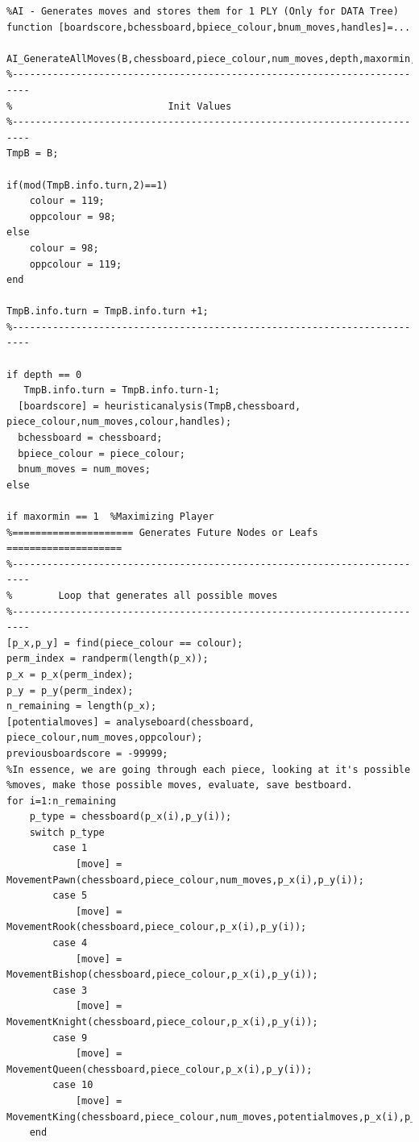 \documentclass[11pt,a4paper]{article}
\begin{document}
\begin{lstlisting}
%AI - Generates moves and stores them for 1 PLY (Only for DATA Tree)
function [boardscore,bchessboard,bpiece_colour,bnum_moves,handles]=...
    AI_GenerateAllMoves(B,chessboard,piece_colour,num_moves,depth,maxormin,alpha,beta,handles)
%-------------------------------------------------------------------------
%                           Init Values
%-------------------------------------------------------------------------
TmpB = B;

if(mod(TmpB.info.turn,2)==1)
    colour = 119;
    oppcolour = 98;
else
    colour = 98;
    oppcolour = 119;
end

TmpB.info.turn = TmpB.info.turn +1;
%-------------------------------------------------------------------------

if depth == 0
   TmpB.info.turn = TmpB.info.turn-1;
  [boardscore] = heuristicanalysis(TmpB,chessboard, piece_colour,num_moves,colour,handles);
  bchessboard = chessboard;
  bpiece_colour = piece_colour;
  bnum_moves = num_moves;
else

if maxormin == 1  %Maximizing Player
%===================== Generates Future Nodes or Leafs ====================
%-------------------------------------------------------------------------
%        Loop that generates all possible moves
%-------------------------------------------------------------------------
[p_x,p_y] = find(piece_colour == colour);
perm_index = randperm(length(p_x));
p_x = p_x(perm_index);
p_y = p_y(perm_index);
n_remaining = length(p_x);
[potentialmoves] = analyseboard(chessboard, piece_colour,num_moves,oppcolour);
previousboardscore = -99999;
%In essence, we are going through each piece, looking at it's possible
%moves, make those possible moves, evaluate, save bestboard.
for i=1:n_remaining
    p_type = chessboard(p_x(i),p_y(i));
    switch p_type
        case 1
            [move] = MovementPawn(chessboard,piece_colour,num_moves,p_x(i),p_y(i));
        case 5
            [move] = MovementRook(chessboard,piece_colour,p_x(i),p_y(i)); 
        case 4
            [move] = MovementBishop(chessboard,piece_colour,p_x(i),p_y(i));
        case 3
            [move] = MovementKnight(chessboard,piece_colour,p_x(i),p_y(i));
        case 9
            [move] = MovementQueen(chessboard,piece_colour,p_x(i),p_y(i));
        case 10
            [move] = MovementKing(chessboard,piece_colour,num_moves,potentialmoves,p_x(i),p_y(i));
    end


\end{lstlisting}
\end{document}
